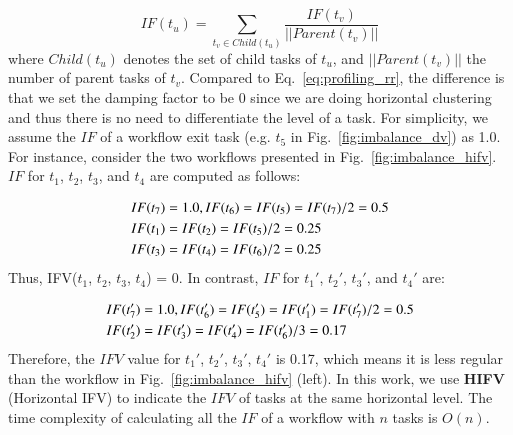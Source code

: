 
\begin{equation}
\label{eq:imbalance_impact_factor}
	IF(t_u)=\sum_{t_v\in Child(t_u)}^{}\frac{IF(t_v)}{||Parent(t_v)||}
\end{equation}
where $Child(t_u)$ denotes the set of child tasks of $t_u$, and $||Parent(t_v)||$ the number of parent tasks of $t_v$. Compared to Eq.~\ref{eq:profiling_rr}, the difference is that we set the damping factor to be 0 since we are doing horizontal clustering and thus there is no need to differentiate the level of a task. For simplicity, we assume the $IF$ of a workflow exit task (e.g. $t_5$ in Fig.~\ref{fig:imbalance_dv}) as 1.0. For instance, consider the two workflows presented in Fig.~\ref{fig:imbalance_hifv}. $IF$ for $t_1$, $t_2$, $t_3$, and $t_4$ are computed as follows:

\begin{eqnarray}
	\displaystyle  
	&IF(t_7 )=1.0, IF(t_6 )=IF(t_5 )=IF(t_7 )/2=0.5\nonumber  \\
	&IF(t_1 )=IF(t_2 )=IF(t_5 )/2=0.25\nonumber \\
	&IF(t_3 )=IF(t_4 )=IF(t_6 )/2=0.25\nonumber 
\end{eqnarray}
Thus, IFV($t_1$, $t_2$, $t_3$, $t_4$) = 0. In contrast, $IF$ for $t_1'$, $t_2'$, $t_3'$, and $t_4'$ are:

\begin{eqnarray}
	\displaystyle  
	&IF(t_7')=1.0, IF(t_6')=IF(t_5')=IF(t_1')=IF(t_7')/2=0.5\nonumber \\
	&IF(t_2')=IF(t_3')=IF(t_4')=IF(t_6')/3=0.17 \nonumber
\end{eqnarray}
Therefore, the $IFV$ value for {$t_1'$, $t_2'$, $t_3'$, $t_4'$} is 0.17, which means it is less regular than the workflow in Fig.~\ref{fig:imbalance_hifv} (left). In this work, we use \textbf{HIFV} (Horizontal IFV) to indicate the $IFV$ of tasks at the same horizontal level. The time complexity of calculating all the $IF$ of a workflow with $n$ tasks is $O(n)$.  



